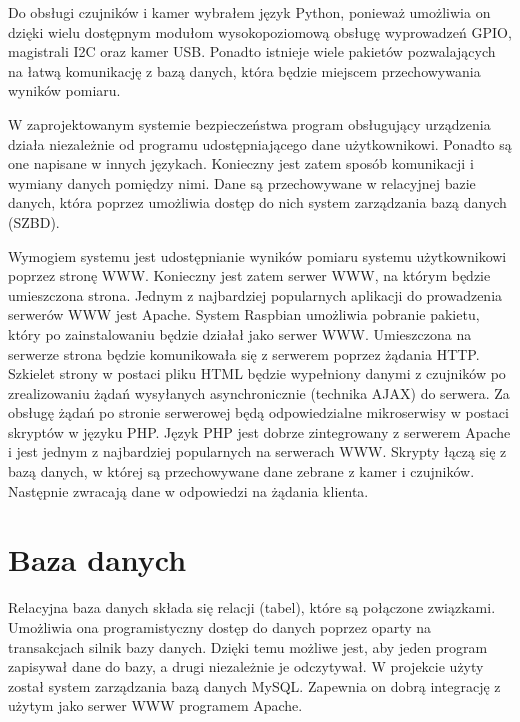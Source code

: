 \documentclass[a4paper,12pt,twoside]{article}
\begin{document}
Do obsługi czujników i kamer wybrałem język Python, ponieważ umożliwia on dzięki wielu dostępnym modułom wysokopoziomową obsługę wyprowadzeń GPIO, magistrali I2C oraz kamer USB. Ponadto istnieje wiele pakietów pozwalających na łatwą komunikację z bazą danych, która będzie miejscem przechowywania wyników pomiaru. 

W zaprojektowanym systemie bezpieczeństwa program obsługujący urządzenia działa niezależnie od programu udostępniającego dane użytkownikowi. Ponadto są one napisane w innych językach. Konieczny jest zatem sposób komunikacji i wymiany danych pomiędzy nimi. Dane są przechowywane w relacyjnej bazie danych, która poprzez umożliwia dostęp do nich system zarządzania bazą danych (SZBD).

Wymogiem systemu jest udostępnianie wyników pomiaru systemu użytkownikowi poprzez stronę WWW. Konieczny jest zatem serwer WWW, na którym będzie umieszczona strona. Jednym z najbardziej popularnych aplikacji do prowadzenia serwerów WWW jest Apache. System Raspbian umożliwia pobranie pakietu, który po zainstalowaniu będzie działał jako serwer WWW. Umieszczona na serwerze strona będzie komunikowała się z serwerem poprzez żądania HTTP. Szkielet strony w postaci pliku HTML będzie wypełniony danymi z czujników po zrealizowaniu żądań wysyłanych asynchronicznie (technika AJAX) do serwera. Za obsługę żądań po stronie serwerowej będą odpowiedzialne mikroserwisy w postaci skryptów w języku PHP. Język PHP jest dobrze zintegrowany z serwerem Apache i jest jednym z najbardziej popularnych na serwerach WWW. Skrypty łączą się z bazą danych, w której są przechowywane dane zebrane z kamer i czujników. Następnie zwracają dane w odpowiedzi na żądania klienta.

\section{Baza danych}
Relacyjna baza danych składa się relacji (tabel), które są połączone związkami. Umożliwia ona programistyczny dostęp do danych poprzez oparty na transakcjach silnik bazy danych. Dzięki temu możliwe jest, aby jeden program zapisywał dane do bazy, a drugi niezależnie je odczytywał. W projekcie użyty został system zarządzania bazą danych MySQL. Zapewnia on dobrą integrację z użytym jako serwer WWW programem Apache.
\end{document}
